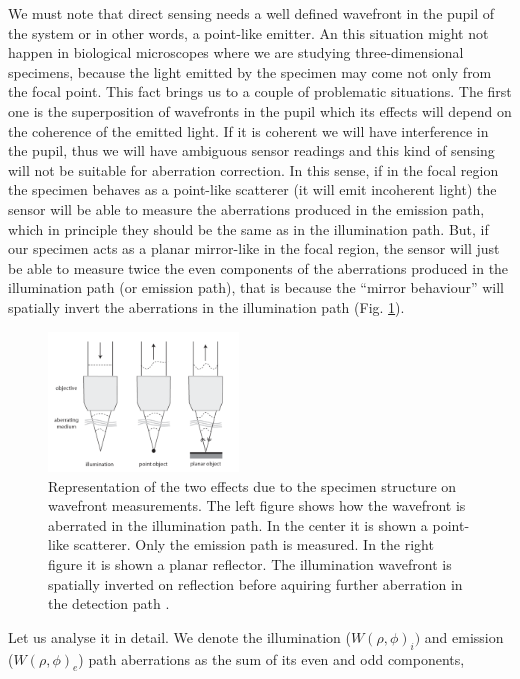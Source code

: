 We must note that direct sensing needs a well defined wavefront in the pupil of the system or in other words, a point-like emitter. An this situation might not happen in biological microscopes where we are studying three-dimensional specimens, because the light emitted by the specimen may come not only from the focal point. This fact brings us to a couple of problematic situations. The first one is the superposition of wavefronts in the pupil which its effects will depend on the coherence of the emitted light. If it is coherent we will have interference in the pupil, thus we will have ambiguous sensor readings and this kind of sensing will not be suitable for aberration correction. In this sense, if in the focal region the specimen behaves as a point-like scatterer (it will emit incoherent light) the sensor will be able to measure the aberrations produced in the emission path, which in principle they should be the same as in the illumination path. But, if our specimen acts as a planar mirror-like in the focal region, the sensor will just be able to measure twice the even components of the aberrations produced in the illumination path (or emission path), that is because the "`mirror behaviour"' will spatially invert the aberrations in the illumination path (Fig. \ref{fig:abe_direct_sensing}). 

\begin{figure}[htbp]
	\centering
		\includegraphics[width=0.45\textwidth]{images/abe_direct_sensing.png}
	\caption{Representation of the two effects due to the specimen structure on wavefront measurements. The left figure shows how the wavefront is aberrated in the illumination path. In the center it is shown a point-like scatterer. Only the emission path is measured. In the right figure it is shown a planar reflector. The illumination wavefront is spatially inverted on reflection before aquiring further aberration in the detection path \cite{AOM_basic_ref}.}
	\label{fig:abe_direct_sensing}
\end{figure}


Let us analyse it in detail. We denote the illumination ($W(\rho,\phi)_i)$ and emission ($W(\rho,\phi)_e$) path aberrations as the sum of its even and odd components,

